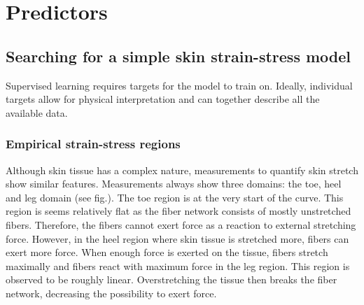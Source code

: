 \section{Predictors}


\subsection{Searching for a simple skin strain-stress model}

Supervised learning requires targets for the model to train on.
Ideally, individual targets allow for physical interpretation and can together describe all the available data.

\subsubsection{Empirical strain-stress regions}
Although skin tissue has a complex nature, measurements to quantify skin stretch show similar features.
Measurements always show three domains: the toe, heel and leg domain (see fig.).
The toe region is at the very start of the curve.
This region is seems relatively flat as the fiber network consists of mostly unstretched fibers.
Therefore, the fibers cannot exert force as a reaction to external stretching force.
However, in the heel region where skin tissue is stretched more, fibers can exert more force.
When enough force is exerted on the tissue, fibers stretch maximally and fibers react with maximum force in the leg region.
This region is observed to be roughly linear.
Overstretching the tissue then breaks the fiber network, decreasing the possibility to exert force.

